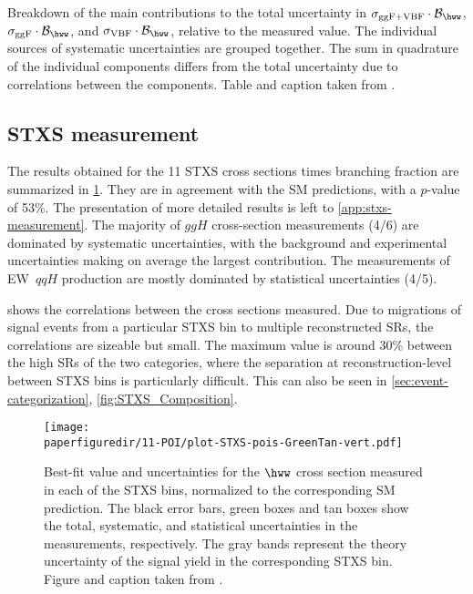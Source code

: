 \begin{table}[ht]
  \centering
  \caption{
    Breakdown of the main contributions to the total uncertainty in $\sigma_{\mathrm{ggF+VBF}} \cdot \mathcal{B}_{\hww}$, $\sigma_{\mathrm{ggF}} \cdot \mathcal{B}_{\hww}$, and $\sigma_{\mathrm{VBF}} \cdot \mathcal{B}_{\hww}$, relative to the measured value.
    The individual sources of systematic uncertainties are grouped together.
    The sum in quadrature of the individual components differs from the total uncertainty due to correlations between the components.
    Table and caption taken from .
  }
  \resizebox{\textwidth}{!}{
    
  }
  \label{tab:UncertaintyBreakdown_2-POI}
\end{table}

\subsection{STXS measurement}
The results obtained for the 11 STXS cross sections times branching fraction are summarized in \cref{fig:11-POI_measurement}. 
They are in agreement with the SM predictions, with a $p$-value of 53\%.
The presentation of more detailed results is left to \cref{app:stxs-measurement}. 
The majority of $ggH$ cross-section measurements (4/6) are dominated by systematic uncertainties, with the background and experimental uncertainties making on average the largest contribution. 
The measurements of EW~$qqH$ production are mostly dominated by statistical uncertainties (4/5). 

 shows the correlations between the cross sections measured. 
Due to migrations of signal events from a particular STXS bin to multiple reconstructed SRs, the correlations are sizeable but small. The maximum value is around 30\% between the high \pTH SRs of the two \TwoJet categories, where the separation at reconstruction-level between STXS bins is particularly difficult. This can also be seen in \cref{sec:event-categorization}, \cref{fig:STXS_Composition}. 
\begin{figure}[htb]
  \centering
  \texttt{[image: \\paperfiguredir/11-POI/plot-STXS-pois-GreenTan-vert.pdf]}
  \caption{
    Best-fit value and uncertainties for the $\hww$ cross section measured in each of the STXS bins, normalized to the corresponding SM prediction.
    The black error bars, green boxes and tan boxes show the total, systematic, and statistical uncertainties in the measurements, respectively.
    The gray bands represent the theory uncertainty of the signal yield in the corresponding STXS bin.
    Figure and caption taken from .
    \label{fig:11-POI_measurement}
  }
\end{figure}

